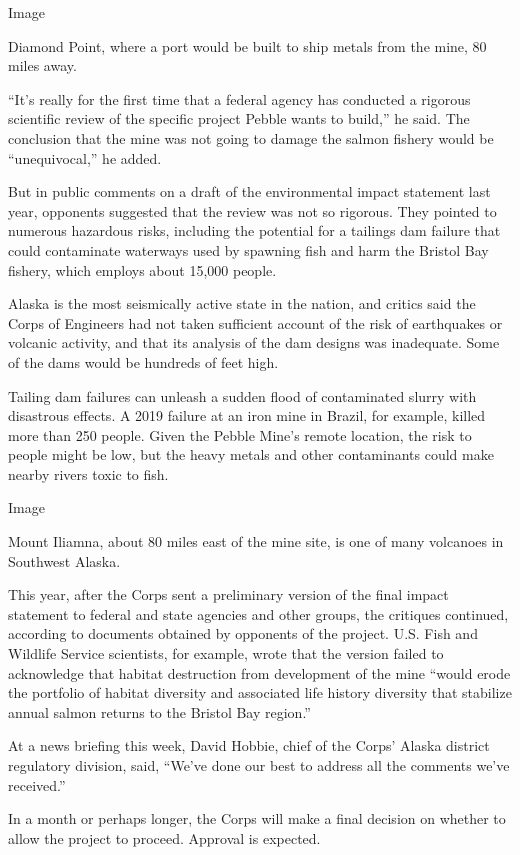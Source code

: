 Image

Diamond Point, where a port would be built to ship metals from the mine,
80 miles away.

``It's really for the first time that a federal agency has conducted a
rigorous scientific review of the specific project Pebble wants to
build,'' he said. The conclusion that the mine was not going to damage
the salmon fishery would be ``unequivocal,'' he added.

But in public comments on a draft of the environmental impact statement
last year, opponents suggested that the review was not so rigorous. They
pointed to numerous hazardous risks, including the potential for a
tailings dam failure that could contaminate waterways used by spawning
fish and harm the Bristol Bay fishery, which employs about 15,000
people.

Alaska is the most seismically active state in the nation, and critics
said the Corps of Engineers had not taken sufficient account of the risk
of earthquakes or volcanic activity, and that its analysis of the dam
designs was inadequate. Some of the dams would be hundreds of feet high.

Tailing dam failures can unleash a sudden flood of contaminated slurry
with disastrous effects. A 2019 failure at an iron mine in Brazil, for
example, killed more than 250 people. Given the Pebble Mine's remote
location, the risk to people might be low, but the heavy metals and
other contaminants could make nearby rivers toxic to fish.

Image

Mount Iliamna, about 80 miles east of the mine site, is one of many
volcanoes in Southwest Alaska.

This year, after the Corps sent a preliminary version of the final
impact statement to federal and state agencies and other groups, the
critiques continued, according to documents obtained by opponents of the
project. U.S. Fish and Wildlife Service scientists, for example, wrote
that the version failed to acknowledge that habitat destruction from
development of the mine ``would erode the portfolio of habitat diversity
and associated life history diversity that stabilize annual salmon
returns to the Bristol Bay region.''

At a news briefing this week, David Hobbie, chief of the Corps' Alaska
district regulatory division, said, ``We've done our best to address all
the comments we've received.''

In a month or perhaps longer, the Corps will make a final decision on
whether to allow the project to proceed. Approval is expected.

